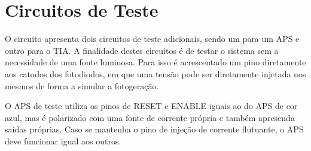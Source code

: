 \section{Circuitos de Teste}
\label{BlocoTestes}

O circuito apresenta dois circuitos de teste adicionais, sendo um para um APS e outro para o TIA. A finalidade destes circuitos \'e de testar o sistema sem a necessidade de uma fonte luminosa. Para isso \'e acrescentado um pino diretamente aos catodos dos fotodiodos, em que uma tensão pode ser diretamente injetada nos mesmos de forma a simular a fotogeração.

O APS de teste utiliza os pinos de RESET e ENABLE iguais ao do APS de cor azul, mas \'e polarizado com uma fonte de corrente pr\'opria e também apresenda sa\'idas pr\'oprias. Caso se mantenha o pino de injeção de corrente flutuante, o APS deve funcionar igual aos outros.